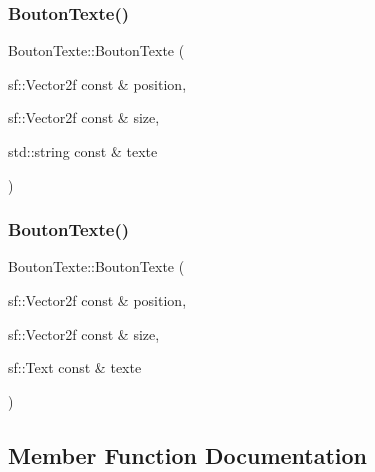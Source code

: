 \mbox{\label{classBoutonTexte_a836b0b82db082f55517c39860d378c97}} 
\subsubsection{\texorpdfstring{Bouton\+Texte()}{BoutonTexte()}\hspace{0.1cm}{\footnotesize\ttfamily [7/8]}}
{\footnotesize\ttfamily Bouton\+Texte\+::\+Bouton\+Texte (\begin{DoxyParamCaption}\item[{sf\+::\+Vector2f const \&}]{position,  }\item[{sf\+::\+Vector2f const \&}]{size,  }\item[{std\+::string const \&}]{texte }\end{DoxyParamCaption})}

\mbox{\label{classBoutonTexte_a73b3eb4345579f281181d3f5df4f196f}} 
\subsubsection{\texorpdfstring{Bouton\+Texte()}{BoutonTexte()}\hspace{0.1cm}{\footnotesize\ttfamily [8/8]}}
{\footnotesize\ttfamily Bouton\+Texte\+::\+Bouton\+Texte (\begin{DoxyParamCaption}\item[{sf\+::\+Vector2f const \&}]{position,  }\item[{sf\+::\+Vector2f const \&}]{size,  }\item[{sf\+::\+Text const \&}]{texte }\end{DoxyParamCaption})}



\subsection{Member Function Documentation}
\mbox{\label{classBoutonTexte_a54ca85310f69ccc120df980495390466}} 
